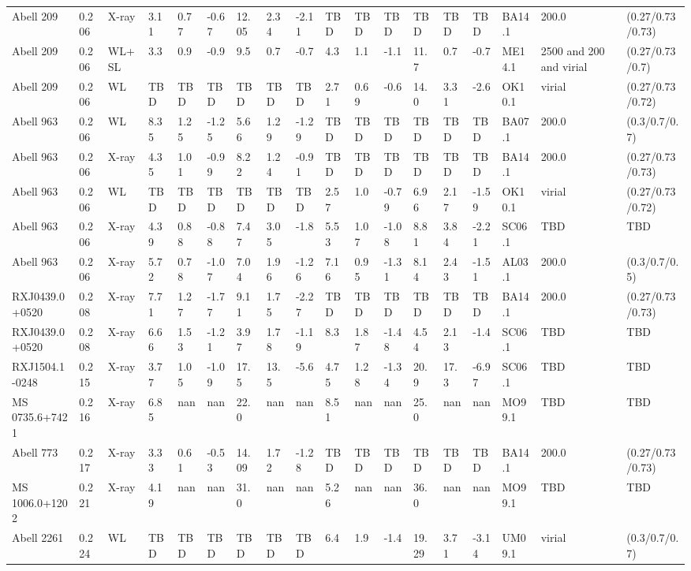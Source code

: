 \documentclass{article}
\begin{document}
\begin{center}
\begin{landscape}
\begin{longtable}{llllllllllllllllll}
Abell 209 & 0.206 & X-ray & 3.11 & 0.77 & -0.67 & 12.05 & 2.34 & -2.11 & TBD & TBD & TBD & TBD & TBD & TBD & BA14.1 & 200.0 & (0.27/0.73/0.73) \\
Abell 209 & 0.206 & WL+SL & 3.3 & 0.9 & -0.9 & 9.5 & 0.7 & -0.7 & 4.3 & 1.1 & -1.1 & 11.7 & 0.7 & -0.7 & ME14.1 & 2500 and 200 and virial & (0.27/0.73/0.7) \\
Abell 209 & 0.206 & WL & TBD & TBD & TBD & TBD & TBD & TBD & 2.71 & 0.69 & -0.6 & 14.0 & 3.31 & -2.6 & OK10.1 & virial & (0.27/0.73/0.72) \\
Abell 963 & 0.206 & WL & 8.35 & 1.25 & -1.25 & 5.66 & 1.29 & -1.29 & TBD & TBD & TBD & TBD & TBD & TBD & BA07.1 & 200.0 & (0.3/0.7/0.7) \\
Abell 963 & 0.206 & X-ray & 4.35 & 1.01 & -0.99 & 8.22 & 1.24 & -0.91 & TBD & TBD & TBD & TBD & TBD & TBD & BA14.1 & 200.0 & (0.27/0.73/0.73) \\
Abell 963 & 0.206 & WL & TBD & TBD & TBD & TBD & TBD & TBD & 2.57 & 1.0 & -0.79 & 6.96 & 2.17 & -1.59 & OK10.1 & virial & (0.27/0.73/0.72) \\
Abell 963 & 0.206 & X-ray & 4.39 & 0.88 & -0.88 & 7.47 & 3.05 & -1.8 & 5.53 & 1.07 & -1.08 & 8.81 & 3.84 & -2.21 & SC06.1 & TBD & TBD \\
Abell 963 & 0.206 & X-ray & 5.72 & 0.78 & -1.07 & 7.04 & 1.96 & -1.26 & 7.16 & 0.95 & -1.31 & 8.14 & 2.43 & -1.51 & AL03.1 & 200.0 & (0.3/0.7/0.5) \\
RXJ0439.0+0520 & 0.208 & X-ray & 7.71 & 1.27 & -1.77 & 9.11 & 1.75 & -2.27 & TBD & TBD & TBD & TBD & TBD & TBD & BA14.1 & 200.0 & (0.27/0.73/0.73) \\
RXJ0439.0+0520 & 0.208 & X-ray & 6.66 & 1.53 & -1.21 & 3.97 & 1.78 & -1.19 & 8.3 & 1.87 & -1.48 & 4.54 & 2.13 & -1.4 & SC06.1 & TBD & TBD \\
RXJ1504.1-0248 & 0.215 & X-ray & 3.77 & 1.05 & -1.09 & 17.5 & 13.5 & -5.6 & 4.75 & 1.28 & -1.34 & 20.9 & 17.3 & -6.97 & SC06.1 & TBD & TBD \\
MS 0735.6+7421 & 0.216 & X-ray & 6.85 & nan & nan & 22.0 & nan & nan & 8.51 & nan & nan & 25.0 & nan & nan & MO99.1 & TBD & TBD \\
Abell 773 & 0.217 & X-ray & 3.33 & 0.61 & -0.53 & 14.09 & 1.72 & -1.28 & TBD & TBD & TBD & TBD & TBD & TBD & BA14.1 & 200.0 & (0.27/0.73/0.73) \\
MS 1006.0+1202 & 0.221 & X-ray & 4.19 & nan & nan & 31.0 & nan & nan & 5.26 & nan & nan & 36.0 & nan & nan & MO99.1 & TBD & TBD \\
Abell 2261 & 0.224 & WL & TBD & TBD & TBD & TBD & TBD & TBD & 6.4 & 1.9 & -1.4 & 19.29 & 3.71 & -3.14 & UM09.1 & virial & (0.3/0.7/0.7) \\

\end{longtable}
\end{landscape}
\end{center}
\end{document}
